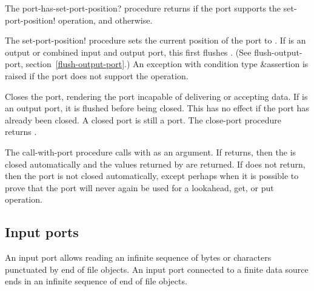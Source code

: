 \begin{entry}{%
}

   
The {\cf port-has-set-port-position?} procedure returns \schtrue{} if the port
supports the {\cf set-port-position!} operation, and \schfalse{}
otherwise.
   
The {\cf set-port-position!} procedure sets the current position
of the port to .  If  is an output or combined
input and output port, this first flushes .  (See {\cf
  flush-output-port}, section~\ref{flush-output-port}.)
An exception with condition type {\cf\&assertion} is raised
if the port does not support the operation.
\end{entry}

\begin{entry}{%
}
   
Closes the port, rendering the port incapable of delivering or
accepting data. If  is an output port, it is flushed before
being closed.  This has no effect if the port has already been closed.
A closed port is still a port.  The {\cf close-port} procedure returns
\unspecifiedreturn.
\end{entry}

\begin{entry}{%
}
   
  The {\cf call-with-port} procedure
calls  with  as an argument. If
 returns, then the  is closed automatically and
the values returned by  are returned. If  does not
return, then the port is not closed automatically, except perhaps when it is
possible to prove that the port will never again be used for a
{\cf lookahead}, {\cf get}, or {\cf put} operation.
\end{entry}

\subsection{Input ports}

An input port allows reading an infinite sequence of bytes
or characters punctuated
by end of file objects. An input port connected to a finite data
source ends in an infinite sequence of end of file objects.

